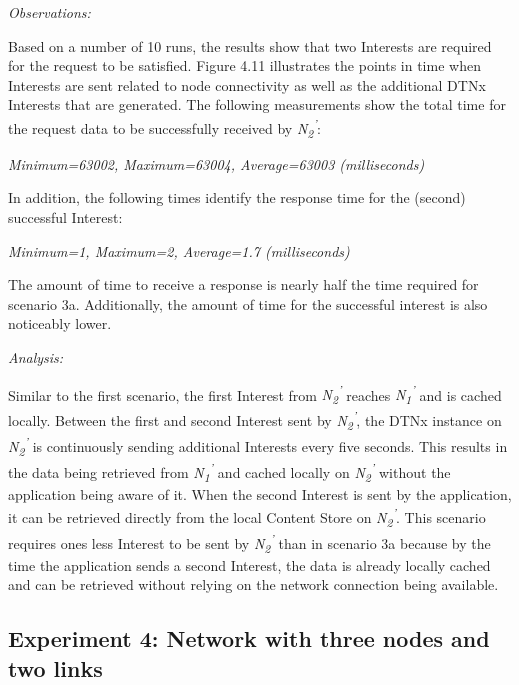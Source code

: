 \documentclass[a4paper,12pt]{report}      %
\begin{document}
\vspace*{1\baselineskip}\noindent\emph{Observations:}

Based on a number of 10 runs, the results show that two Interests are required for the request to be
satisfied. Figure 4.11 illustrates the points in time when Interests are sent related to node connectivity as well as 
the additional DTNx Interests that are generated. The following measurements show the total time for the request data to be successfully received by \emph{N\textsubscript{2}\textsuperscript{'}}:

\begin{center}\textsl{Minimum=63002, Maximum=63004, Average=63003 (milliseconds)}\end{center}

In addition, the following times identify the response time for the (second) successful Interest:

\begin{center}\textsl{Minimum=1, Maximum=2, Average=1.7 (milliseconds)}\end{center}

The amount of time to receive a response is nearly half the time required for scenario 3a. Additionally, the amount of time for the 
successful interest is also noticeably lower.

\vspace*{1\baselineskip}\noindent\emph{Analysis:}

Similar to the first scenario, the first Interest from \emph{N\textsubscript{2}\textsuperscript{'}} reaches \emph{N\textsubscript{1}\textsuperscript{'}} and is cached locally. Between the first and second Interest sent by \emph{N\textsubscript{2}\textsuperscript{'}}, the DTNx instance on \emph{N\textsubscript{2}\textsuperscript{'}} is continuously sending additional Interests every five seconds. This results in the data being retrieved from \emph{N\textsubscript{1}\textsuperscript{'}} and cached locally on \emph{N\textsubscript{2}\textsuperscript{'}} without the application being aware of it. When the second Interest is sent by the application, it can be retrieved directly from the local Content Store on \emph{N\textsubscript{2}\textsuperscript{'}}. This scenario requires ones less Interest to be sent by \emph{N\textsubscript{2}\textsuperscript{'}} than in scenario 3a because by the time the application sends a second Interest, the data is already locally cached and can be retrieved without relying on the network connection being available.

\subsection{Experiment 4: Network with three nodes and two links}
\end{document}
